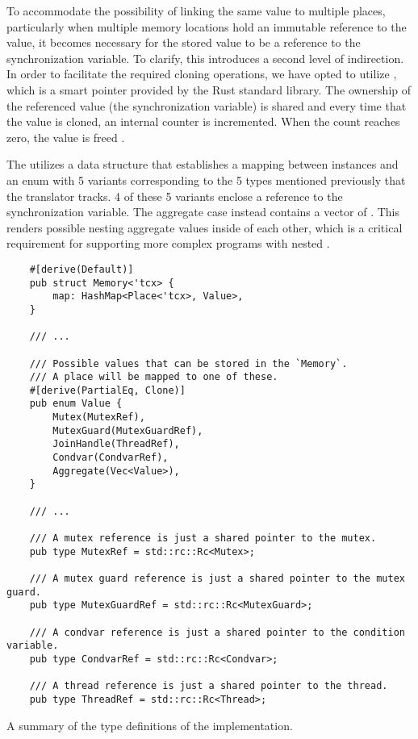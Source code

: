 To accommodate the possibility of linking the same value to multiple places,
particularly when multiple memory locations hold an immutable reference to the value,
it becomes necessary for the stored value to be a reference to the synchronization variable.
To clarify, this introduces a second level of indirection.
In order to facilitate the required cloning operations,
we have opted to utilize ,
which is a smart pointer provided by the Rust standard library.
The ownership of the referenced value (the synchronization variable) is shared
and every time that the value is cloned, an internal counter is incremented.
When the count reaches zero, the value is freed \cite[Chap. 15.4]{rust-book}.

The  utilizes a  data structure
that establishes a mapping between  instances and
an enum with 5 variants corresponding to
the 5 types mentioned previously that the translator tracks.
4 of these 5 variants enclose a 
reference to the synchronization variable.
The aggregate case instead contains a vector of .
This renders possible nesting aggregate values inside of each other,
which is a critical requirement for supporting more complex programs with nested .

\begin{listing}[!htb]
  \begin{verbatim}
    #[derive(Default)]
    pub struct Memory<'tcx> {
        map: HashMap<Place<'tcx>, Value>,
    }

    /// ...

    /// Possible values that can be stored in the `Memory`.
    /// A place will be mapped to one of these.
    #[derive(PartialEq, Clone)]
    pub enum Value {
        Mutex(MutexRef),
        MutexGuard(MutexGuardRef),
        JoinHandle(ThreadRef),
        Condvar(CondvarRef),
        Aggregate(Vec<Value>),
    }

    /// ...
    
    /// A mutex reference is just a shared pointer to the mutex.
    pub type MutexRef = std::rc::Rc<Mutex>;

    /// A mutex guard reference is just a shared pointer to the mutex guard.
    pub type MutexGuardRef = std::rc::Rc<MutexGuard>;

    /// A condvar reference is just a shared pointer to the condition variable.
    pub type CondvarRef = std::rc::Rc<Condvar>;

    /// A thread reference is just a shared pointer to the thread.
    pub type ThreadRef = std::rc::Rc<Thread>;
  \end{verbatim}
  \caption{A summary of the type definitions of the  implementation.}
  \label{lst:memory-implementation}
\end{listing}

